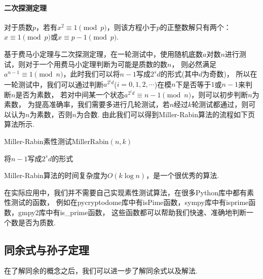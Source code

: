 \documentclass{book}
\numberwithin{equation}{subsubsection}
\begin{document}
\paragraph{\textbf{二次探测定理}}
对于质数$p$，若有$x^2\equiv 1\pmod{p}$，则该方程小于$p$的正整数解只有两个：$x\equiv 1\pmod{p}$或$x\equiv p-1\pmod{p}$.\par
基于费马小定理与二次探测定理，在一轮测试中，使用随机底数$a$对数$n$进行测试，则对于一个用费马小定理判断为可能是质数的数$n$，
则必然满足$a^{n-1}\equiv 1\pmod{n}$，此时我们可以将$n-1$写成$2^sd$的形式(其中$d$为奇数)，
所以在一轮测试中，我们可以通过判断$a^{2^{i}d}$($i=0,1,2,\cdots $)在模$n$下是否等于$1$或$n-1$来判断$n$是否为素数，
若对中间某一个状态$a^{2^{i}d}\equiv n-1\pmod{n}$，则可以初步判断$n$为素数，
为提高准确率，我们需要多进行几轮测试，若$n$经过$k$轮测试都通过，则可以认为$n$为素数，否则$n$为合数.
由此我们可以得到Miller-Rabin算法的流程如下页算法所示.
\begin{algorithm}[ht!]
    \caption{Miller-Rabin素性测试$\text{MillerRabin}(n,k)$}
    将$n-1$写成$2^sd$的形式\\
\end{algorithm}\par
Miller-Rabin算法的时间复杂度为$O(k\log{n})$，是一个很优秀的算法.\par
在实际应用中，我们并不需要自己实现素性测试算法，在很多Python库中都有素性测试的函数，
例如在pycryptodome库中有isPime函数，sympy库中有isprime函数，gmpy2库中有is\_prime函数，
这些函数都可以帮助我们快速、准确地判断一个数是否为质数.

\subsection{同余式与孙子定理}
在了解同余的概念之后，我们可以进一步了解同余式以及解法.\par
\end{document}
